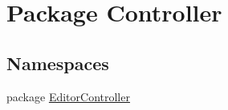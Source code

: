 \hypertarget{namespace_controller}{\section{Package Controller}
\label{namespace_controller}
}
\subsection*{Namespaces}
\begin{DoxyCompactItemize}
\item 
package \hyperlink{namespace_controller_1_1_editor_controller}{Editor\-Controller}
\end{DoxyCompactItemize}
